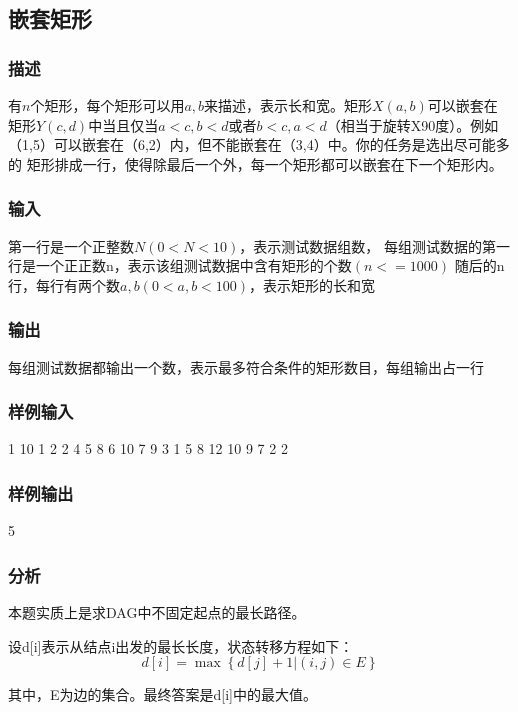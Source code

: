 \subsection{嵌套矩形}

\subsubsection{描述}
有$n$个矩形，每个矩形可以用$a,b$来描述，表示长和宽。矩形$X(a,b)$可以嵌套在
矩形$Y(c,d)$中当且仅当$a<c,b<d$或者$b<c,a<d$（相当于旋转X90度）。例如
（1,5）可以嵌套在（6,2）内，但不能嵌套在（3,4）中。你的任务是选出尽可能多的
矩形排成一行，使得除最后一个外，每一个矩形都可以嵌套在下一个矩形内。

\subsubsection{输入}
第一行是一个正整数$N(0<N<10)$，表示测试数据组数，
每组测试数据的第一行是一个正正数n，表示该组测试数据中含有矩形的个数$(n<=1000)$
随后的n行，每行有两个数$a,b(0<a,b<100)$，表示矩形的长和宽

\subsubsection{输出}
每组测试数据都输出一个数，表示最多符合条件的矩形数目，每组输出占一行

\subsubsection{样例输入}
\begin{Code}
1
10
1 2
2 4
5 8
6 10
7 9
3 1
5 8
12 10
9 7
2 2
\end{Code}

\subsubsection{样例输出}
\begin{Code}
5
\end{Code}

\subsubsection{分析}
本题实质上是求DAG中不固定起点的最长路径。

设d[i]表示从结点i出发的最长长度，状态转移方程如下：
$$d[i]=\max\left\{d[j]+1|(i,j) \in E\right\}$$

其中，E为边的集合。最终答案是d[i]中的最大值。

